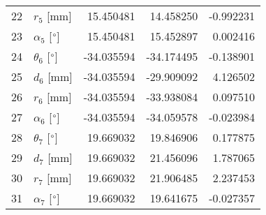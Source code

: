 \documentclass{standalone}%
\begin{document}
\begin{tabular}{llrrr}
22 &              $r_{5}$ [mm] &  15.450481 &  14.458250 &  -0.992231 \\
23 &  $\alpha_{5}$ [$\degree$] &  15.450481 &  15.452897 &   0.002416 \\
24 &  $\theta_{6}$ [$\degree$] & -34.035594 & -34.174495 &  -0.138901 \\
25 &              $d_{6}$ [mm] & -34.035594 & -29.909092 &   4.126502 \\
26 &              $r_{6}$ [mm] & -34.035594 & -33.938084 &   0.097510 \\
27 &  $\alpha_{6}$ [$\degree$] & -34.035594 & -34.059578 &  -0.023984 \\
28 &  $\theta_{7}$ [$\degree$] &  19.669032 &  19.846906 &   0.177875 \\
29 &              $d_{7}$ [mm] &  19.669032 &  21.456096 &   1.787065 \\
30 &              $r_{7}$ [mm] &  19.669032 &  21.906485 &   2.237453 \\
31 &  $\alpha_{7}$ [$\degree$] &  19.669032 &  19.641675 &  -0.027357 \\
\bottomrule
\end{tabular}
%
\end{document}

